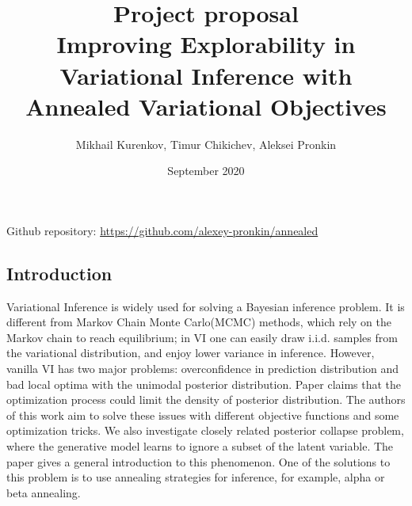 \documentclass[a4paper]{article}
\title{Project proposal \\ Improving Explorability in Variational Inference with Annealed Variational Objectives}
\author{Mikhail Kurenkov, Timur Chikichev, Aleksei Pronkin}
\date{September 2020}
\begin{document}
\maketitle

Github repository:
\url{https://github.com/alexey-pronkin/annealed}



\subsection*{Introduction}






Variational Inference is widely used for solving a Bayesian inference problem. It is different from Markov Chain Monte Carlo(MCMC) methods, which rely on the Markov chain to reach equilibrium; in VI one can easily draw i.i.d. samples from the variational distribution, and enjoy lower variance in inference. However, vanilla VI has two major problems: overconfidence in prediction distribution and bad local optima with the unimodal posterior distribution. Paper \cite{main_Huang2018ImprovingEI} claims that the optimization process could limit the density of posterior distribution. The authors of this work aim to solve these issues with different objective functions and some optimization tricks. We also investigate closely related posterior collapse problem, where the generative model learns to ignore a subset of the latent variable. The paper \cite{lucas2019understanding} gives a general introduction to this phenomenon. One of the solutions to this problem is to use annealing strategies for inference, for example, alpha or beta annealing. 
\end{document}
